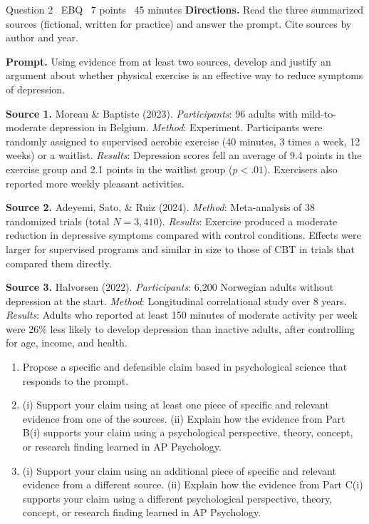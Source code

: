 \documentclass[11pt]{article}
\begin{document}
\begin{frq}{Question 2 \textperiodcentered\ EBQ \textperiodcentered\ 7 points \textperiodcentered\ 45 minutes}
\small
\textbf{Directions.} Read the three summarized sources (fictional, written for practice) and answer the prompt. Cite sources by author and year.

\textbf{Prompt.} Using evidence from at least two sources, develop and justify an argument about whether physical exercise is an effective way to reduce symptoms of depression.

\medskip
\textbf{Source 1.} Moreau \& Baptiste (2023). \emph{Participants}: 96 adults with mild-to-moderate depression in Belgium. \emph{Method}: Experiment. Participants were randomly assigned to supervised aerobic exercise (40 minutes, 3 times a week, 12 weeks) or a waitlist. \emph{Results}: Depression scores fell an average of 9.4 points in the exercise group and 2.1 points in the waitlist group (\(p < .01\)). Exercisers also reported more weekly pleasant activities.

\textbf{Source 2.} Adeyemi, Sato, \& Ruiz (2024). \emph{Method}: Meta-analysis of 38 randomized trials (total \(N = 3{,}410\)). \emph{Results}: Exercise produced a moderate reduction in depressive symptoms compared with control conditions. Effects were larger for supervised programs and similar in size to those of CBT in trials that compared them directly.

\textbf{Source 3.} Halvorsen (2022). \emph{Participants}: 6{,}200 Norwegian adults without depression at the start. \emph{Method}: Longitudinal correlational study over 8 years. \emph{Results}: Adults who reported at least 150 minutes of moderate activity per week were 26\% less likely to develop depression than inactive adults, after controlling for age, income, and health.

\medskip
\begin{enumerate}[label=(\Alph*),leftmargin=2em,itemsep=3pt]
\item Propose a specific and defensible claim based in psychological science that responds to the prompt.
\item (i) Support your claim using at least one piece of specific and relevant evidence from one of the sources. (ii) Explain how the evidence from Part B(i) supports your claim using a psychological perspective, theory, concept, or research finding learned in AP Psychology.
\item (i) Support your claim using an additional piece of specific and relevant evidence from a different source. (ii) Explain how the evidence from Part C(i) supports your claim using a different psychological perspective, theory, concept, or research finding learned in AP Psychology.
\end{enumerate}
\end{frq}
\end{document}
